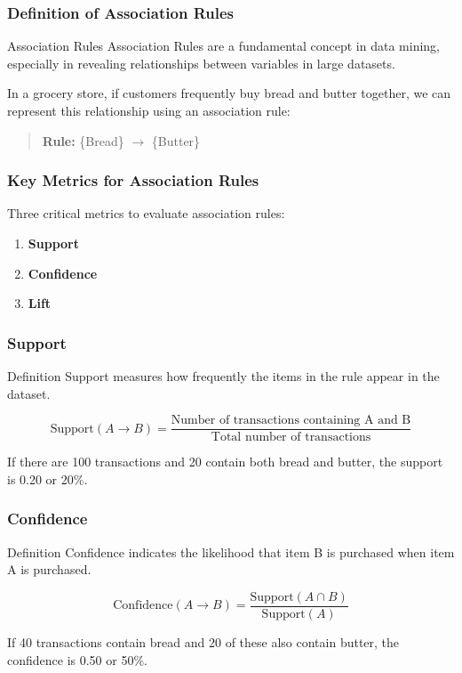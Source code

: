 \documentclass[aspectratio=169]{beamer}
\begin{document}
\begin{frame}[fragile]
    \frametitle{Definition of Association Rules}
    \begin{block}{Association Rules}
        Association Rules are a fundamental concept in data mining, especially in revealing relationships between variables in large datasets.
    \end{block}

    \begin{example}
    In a grocery store, if customers frequently buy bread and butter together, we can represent this relationship using an association rule:
    \begin{quote}
        \textbf{Rule:} \{Bread\} $\rightarrow$ \{Butter\}
    \end{quote}
    \end{example}
\end{frame}

\begin{frame}[fragile]
    \frametitle{Key Metrics for Association Rules}
    Three critical metrics to evaluate association rules:
    \begin{enumerate}
        \item \textbf{Support}
        \item \textbf{Confidence}
        \item \textbf{Lift}
    \end{enumerate}
\end{frame}

\begin{frame}[fragile]
    \frametitle{Support}
    \begin{block}{Definition}
        Support measures how frequently the items in the rule appear in the dataset.
    \end{block}
    \begin{equation}
    \text{Support}(A \rightarrow B) = \frac{\text{Number of transactions containing A and B}}{\text{Total number of transactions}}
    \end{equation}

    \begin{example}
    If there are 100 transactions and 20 contain both bread and butter, the support is 0.20 or 20\%.
    \end{example}
\end{frame}

\begin{frame}[fragile]
    \frametitle{Confidence}
    \begin{block}{Definition}
        Confidence indicates the likelihood that item B is purchased when item A is purchased.
    \end{block}
    \begin{equation}
    \text{Confidence}(A \rightarrow B) = \frac{\text{Support}(A \cap B)}{\text{Support}(A)}
    \end{equation}

    \begin{example}
    If 40 transactions contain bread and 20 of these also contain butter, the confidence is 0.50 or 50\%.
    \end{example}
\end{frame}
\end{document}
